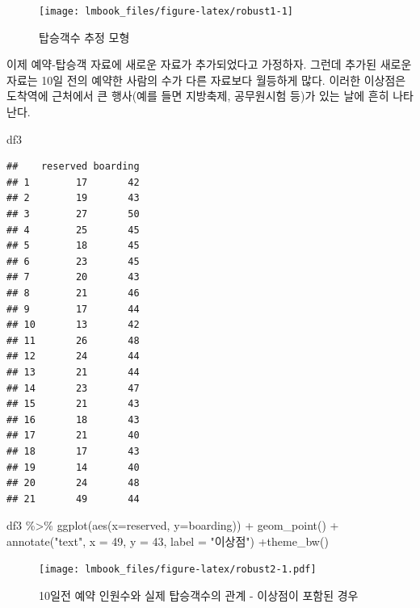 \documentclass[
  10pt,
]{book}
\newenvironment{Shaded}{\begin{snugshade}}{\end{snugshade}}
\newcommand{\AttributeTok}[1]{\textcolor[rgb]{0.77,0.63,0.00}{#1}}
\newcommand{\DecValTok}[1]{\textcolor[rgb]{0.00,0.00,0.81}{#1}}
\newcommand{\FunctionTok}[1]{\textcolor[rgb]{0.00,0.00,0.00}{#1}}
\newcommand{\NormalTok}[1]{#1}
\newcommand{\SpecialCharTok}[1]{\textcolor[rgb]{0.00,0.00,0.00}{#1}}
\newcommand{\StringTok}[1]{\textcolor[rgb]{0.31,0.60,0.02}{#1}}
\theoremstyle{definition}
\theoremstyle{definition}
\theoremstyle{definition}
\theoremstyle{definition}
\theoremstyle{remark}
\begin{document}
\begin{figure}

{\centering \texttt{[image: lmbook\_files/figure-latex/robust1-1]} 

}

\caption{탑승객수 추정 모형}\label{fig:robust1}
\end{figure}

이제 예약-탑승객 자료에 새로운 자료가 추가되었다고 가정하자. 그런데 추가된 새로운 자료는 10일 전의 예약한 사람의 수가 다른 자료보다 월등하게 많다. 이러한 이상점은 도착역에 근처에서 큰 행사(예를 들면 지방축제, 공무원시험 등)가 있는 날에 흔히 나타난다.

\begin{Shaded}
\begin{Highlighting}[]
\NormalTok{df3}
\end{Highlighting}
\end{Shaded}

\begin{verbatim}
##    reserved boarding
## 1        17       42
## 2        19       43
## 3        27       50
## 4        25       45
## 5        18       45
## 6        23       45
## 7        20       43
## 8        21       46
## 9        17       44
## 10       13       42
## 11       26       48
## 12       24       44
## 13       21       44
## 14       23       47
## 15       21       43
## 16       18       43
## 17       21       40
## 18       17       43
## 19       14       40
## 20       24       48
## 21       49       44
\end{verbatim}

\begin{Shaded}
\begin{Highlighting}[]
\NormalTok{df3 }\SpecialCharTok{\%\textgreater{}\%} \FunctionTok{ggplot}\NormalTok{(}\FunctionTok{aes}\NormalTok{(}\AttributeTok{x=}\NormalTok{reserved, }\AttributeTok{y=}\NormalTok{boarding)) }\SpecialCharTok{+} \FunctionTok{geom\_point}\NormalTok{() }\SpecialCharTok{+} \FunctionTok{annotate}\NormalTok{(}\StringTok{"text"}\NormalTok{, }\AttributeTok{x =} \DecValTok{49}\NormalTok{, }\AttributeTok{y =} \DecValTok{43}\NormalTok{, }\AttributeTok{label =} \StringTok{"이상점"}\NormalTok{) }\SpecialCharTok{+}\FunctionTok{theme\_bw}\NormalTok{()}
\end{Highlighting}
\end{Shaded}

\begin{figure}
\centering
\texttt{[image: lmbook\_files/figure-latex/robust2-1.pdf]}
\caption{\label{fig:robust2}10일전 예약 인원수와 실제 탑승객수의 관계 - 이상점이 포함된 경우}
\end{figure}
\end{document}
